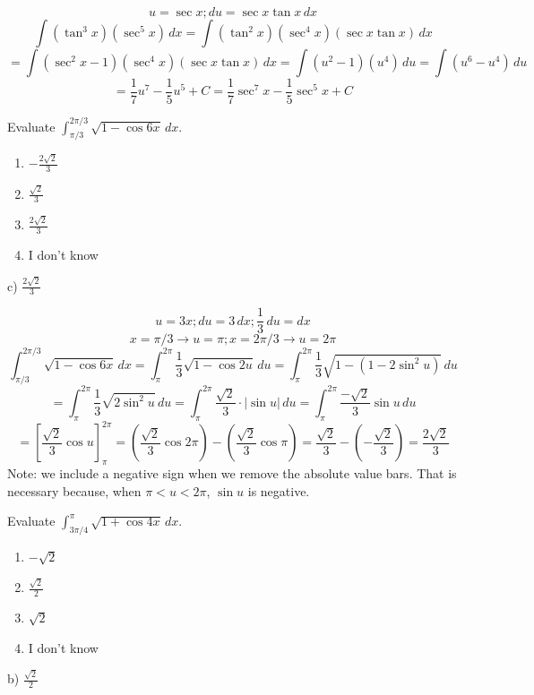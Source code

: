 \documentclass[addpoints,12pt,answers]{exam}
\begin{document}
\begin{questions}
\begin{solution}
    $$u=\sec x; du=\sec x\tan x\,dx$$
    $$\int(\tan^3 x)(\sec^5 x)\,dx=\int(\tan^2 x)(\sec^4 x)(\sec x\tan x)\,dx$$
    $$=\int(\sec^2 x-1)(\sec^4 x)(\sec x\tan x)\,dx=\int(u^2-1)(u^4)\,du=\int(u^6-u^4)\,du$$
    $$=\frac{1}{7}u^7-\frac{1}{5}u^5+C=\frac{1}{7}\sec^7 x-\frac{1}{5}\sec^5 x+C$$
  \end{solution}
  \newpage
  \question
  Evaluate $\displaystyle\int_{\pi/3}^{2\pi/3}\sqrt{1-\cos 6x}\,dx$.
  \begin{enumerate}[label=\alph*)]
    \item
    $\displaystyle -\frac{2\sqrt{2}}{3}$
    \item
    $\displaystyle\frac{\sqrt{2}}{3}$
    \item
    $\displaystyle\frac{2\sqrt{2}}{3}$
    \item
    I don't know
  \end{enumerate}
  \begin{solution}
    c) $\displaystyle\frac{2\sqrt{2}}{3}$
    
    $$u=3x; du=3\,dx; \frac{1}{3}\,du=dx$$
    $$x=\pi/3\rightarrow u=\pi; x=2\pi/3\rightarrow u=2\pi$$
    $$\displaystyle\int_{\pi/3}^{2\pi/3}\sqrt{1-\cos 6x}\,dx=\int_\pi^{2\pi}\frac{1}{3}\sqrt{1-\cos 2u}\,du=\int_\pi^{2\pi}\frac{1}{3}\sqrt{1-(1-2\sin^2 u)}\,du$$
    $$=\int_\pi^{2\pi}\frac{1}{3}\sqrt{2\sin^2 u}\,du=\int_\pi^{2\pi}\frac{\sqrt{2}}{3}\cdot|\sin u|\,du=\int_\pi^{2\pi}\frac{-\sqrt{2}}{3}\sin u\,du$$
    $$=\left[\frac{\sqrt{2}}{3}\cos u\right]_\pi^{2\pi}=\left(\frac{\sqrt{2}}{3}\cos 2\pi\right)-\left(\frac{\sqrt{2}}{3}\cos\pi\right)=\frac{\sqrt{2}}{3}-\left(-\frac{\sqrt{2}}{3}\right)=\frac{2\sqrt{2}}{3}$$
    Note: we include a negative sign when we remove the absolute value bars. That is necessary because, when $\pi<u<2\pi$, $\sin u$ is negative.
  \end{solution}
  \newpage
  \question
  Evaluate $\displaystyle\int_{3\pi/4}^{\pi}\sqrt{1+\cos 4x}\,dx$.
  \begin{enumerate}[label=\alph*)]
    \item
    $-\sqrt{2}$
    \item
    $\displaystyle\frac{\sqrt{2}}{2}$
    \item
    $\sqrt{2}$
    \item
    I don't know
  \end{enumerate}
  \begin{solution}
    b) $\displaystyle\frac{\sqrt{2}}{2}$
    

\end{solution}
\end{questions}
\end{document}
